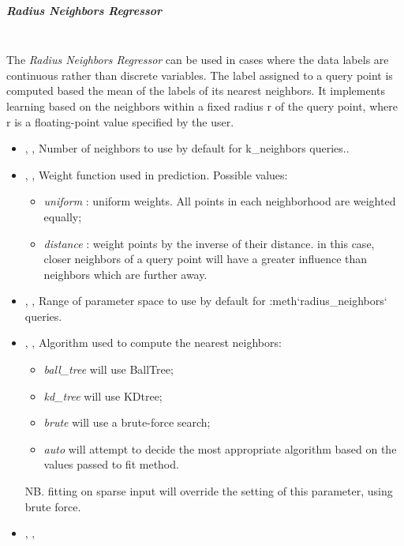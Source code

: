 \subparagraph{Radius Neighbors Regressor}
\mbox{}
\\The \textit{Radius Neighbors Regressor} can be used in cases where the data
labels are continuous rather than discrete variables.
%
The label assigned to a query point is computed based the mean of the labels of
its nearest neighbors.
%
It implements learning based on the neighbors within a fixed radius r of the
query point, where r is a floating-point value specified by the user.
%
\begin{itemize}
  \item {} , ,
  Number of neighbors to use by default for k\_neighbors queries..
  \item {} , ,
  Weight function used in prediction.
  Possible values:
\begin{itemize}
    \item \textit{uniform} : uniform weights.
    All points in each neighborhood are weighted equally;
    \item \textit{distance} : weight points by the inverse of their distance.
    in this case, closer neighbors of a query point will have a greater
    influence than neighbors which are further away.
\end{itemize}
  \item {} , ,
  Range of parameter space to use by default for :meth`radius\_neighbors`
  queries.
  \item {} , ,
  Algorithm used to compute the nearest neighbors:
\begin{itemize}
    \item \textit{ball\_tree} will use BallTree;
    \item \textit{kd\_tree} will use KDtree;
    \item \textit{brute} will use a brute-force search;
    \item \textit{auto} will attempt to decide the most appropriate algorithm
    based on the values passed to fit method.
\end{itemize}
  NB.
  fitting on sparse input will override the setting of this parameter, using
  brute force.
  \item {} , ,

\end{itemize}
